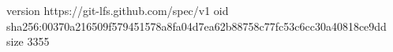 version https://git-lfs.github.com/spec/v1
oid sha256:00370a216509f579451578a8fa04d7ea62b88758c77fc53c6cc30a40818ce9dd
size 3355
